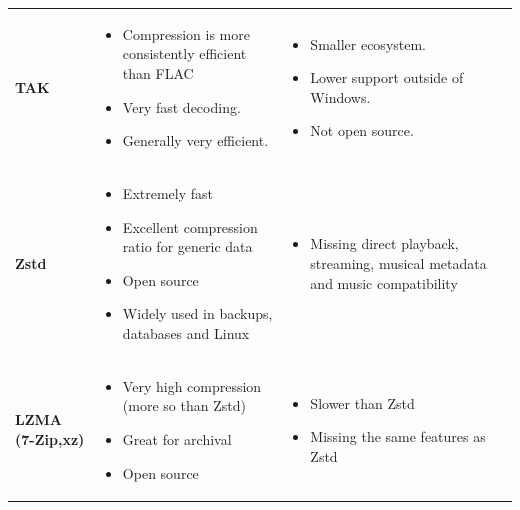 \begin{table}[htbp]
\begin{tabularx}{\textwidth}{
        @{}
        >{\raggedright\arraybackslash}p{}
        >{\raggedright\arraybackslash}X
        >{\raggedright\arraybackslash}X
        @{}
    }
        \addlinespace
        \midrule

        \textbf{TAK}
        &
        \begin{itemize}[leftmargin=*, nosep]
            \item Compression is more consistently efficient than FLAC
            \item Very fast decoding.
            \item Generally very efficient.
        \end{itemize}
        &
        \begin{itemize}[leftmargin=*, nosep]
            \item Smaller ecosystem.
            \item Lower support outside of Windows.
            \item Not open source.
        \end{itemize}
        \\

        \addlinespace
        \midrule

        \textbf{Zstd}
        &
        \begin{itemize}[leftmargin=*, nosep]
            \item Extremely fast
            \item Excellent compression ratio for generic data
            \item Open source
            \item Widely used in backups, databases and Linux
        \end{itemize}
        &
        \begin{itemize}[leftmargin=*, nosep]
            \item Missing direct playback, streaming, musical metadata and music compatibility
        \end{itemize}
        \\
        
        \addlinespace
        \midrule

        \textbf{LZMA (7-Zip,xz)}
        &
        \begin{itemize}[leftmargin=*, nosep]
            \item Very high compression (more so than Zstd)
            \item Great for archival
            \item Open source
        \end{itemize}
        &
        \begin{itemize}[leftmargin=*, nosep]
            \item Slower than Zstd
            \item Missing the same features as Zstd
        \end{itemize}
        \\


\end{tabularx}
\end{table}
